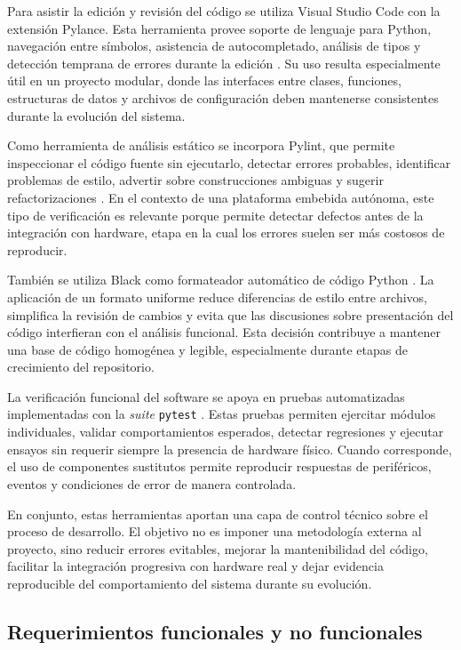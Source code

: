 Para asistir la edición y revisión del código se utiliza Visual Studio Code con la extensión Pylance. Esta herramienta provee soporte de lenguaje para Python, navegación entre símbolos, asistencia de autocompletado, análisis de tipos y detección temprana de errores durante la edición \citep{PylanceDocs}. Su uso resulta especialmente útil en un proyecto modular, donde las interfaces entre clases, funciones, estructuras de datos y archivos de configuración deben mantenerse consistentes durante la evolución del sistema.

Como herramienta de análisis estático se incorpora Pylint, que permite inspeccionar el código fuente sin ejecutarlo, detectar errores probables, identificar problemas de estilo, advertir sobre construcciones ambiguas y sugerir refactorizaciones \citep{PylintDocs}. En el contexto de una plataforma embebida autónoma, este tipo de verificación es relevante porque permite detectar defectos antes de la integración con hardware, etapa en la cual los errores suelen ser más costosos de reproducir.

También se utiliza Black como formateador automático de código Python \citep{BlackDocs}. La aplicación de un formato uniforme reduce diferencias de estilo entre archivos, simplifica la revisión de cambios y evita que las discusiones sobre presentación del código interfieran con el análisis funcional. Esta decisión contribuye a mantener una base de código homogénea y legible, especialmente durante etapas de crecimiento del repositorio.

La verificación funcional del software se apoya en pruebas automatizadas implementadas con la \textit{suite}  \texttt{pytest} \citep{pytestDocs}. Estas pruebas permiten ejercitar módulos individuales, validar comportamientos esperados, detectar regresiones y ejecutar ensayos sin requerir siempre la presencia de hardware físico. Cuando corresponde, el uso de componentes sustitutos permite reproducir respuestas de periféricos, eventos y condiciones de error de manera controlada.

En conjunto, estas herramientas aportan una capa de control técnico sobre el proceso de desarrollo. El objetivo no es imponer una metodología externa al proyecto, sino reducir errores evitables, mejorar la mantenibilidad del código, facilitar la integración progresiva con hardware real y dejar evidencia reproducible del comportamiento del sistema durante su evolución.

\subsection{Requerimientos funcionales y no funcionales}
\label{subsec:requerimientos}

